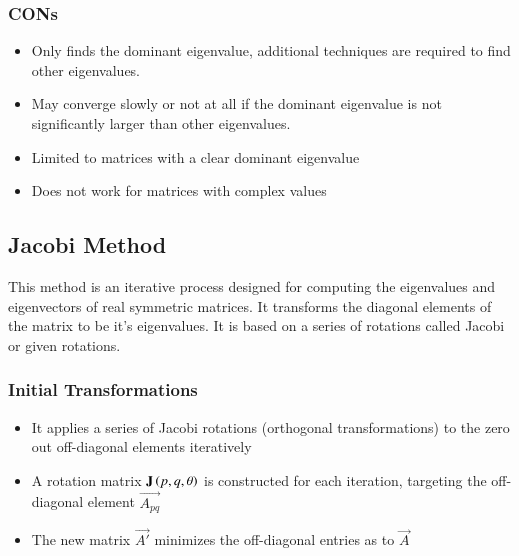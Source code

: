 \documentclass[journal]{IEEEtran}
\begin{document}
\subsubsection{CONs}
 \begin{itemize} 
 \item Only finds the dominant eigenvalue, additional techniques are required to find other eigenvalues. 
 \item May converge slowly or not at all if the dominant eigenvalue is not significantly larger than other eigenvalues.
 \item Limited to matrices with a clear dominant eigenvalue
 \item Does not work for matrices with complex values 
 \end{itemize}
\subsection{\textbf{Jacobi Method}}
This method is an iterative process designed for computing the eigenvalues and eigenvectors of real symmetric matrices. It transforms the diagonal elements of the matrix to be it's eigenvalues. It is based on a series of rotations called Jacobi or given rotations.\\
\subsubsection{Initial Transformations}
\begin{itemize}
    \item It applies a series of Jacobi rotations (orthogonal transformations) to the zero out off-diagonal elements iteratively 
    \item A rotation matrix $\mathbf{J}\left(p,q,\theta\right)$ is constructed for each iteration, targeting the off-diagonal element $\vec{A_{pq}}$
    \item The new matrix $\vec{A'}$ minimizes the off-diagonal entries as to $\vec{A}$\\
\end{itemize}
\end{document}
